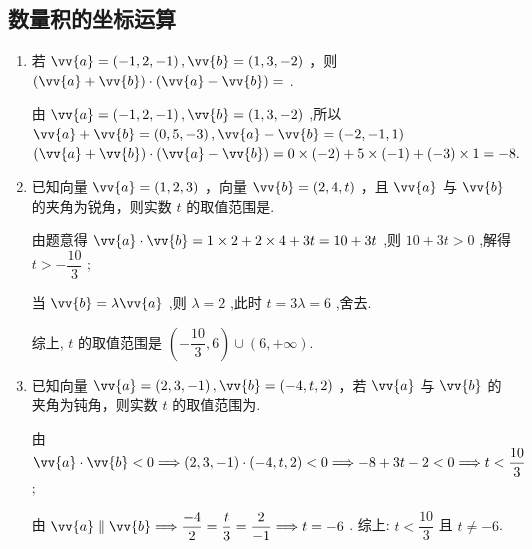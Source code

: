 \subsection*{数量积的坐标运算}
\begin{enumerate}
    \item 若 $\vv{a} = \left( {-1,2, - 1}\right) ,\vv{b} = \left( {1,3, - 2}\right)$ ，则 $\left( {\vv{a} + \vv{b}}\right)  \cdot  \left( {\vv{a} - \vv{b}}\right)  =$ .
    \begin{jieda}
        由 $\vv{a} = \left( {-1,2, - 1}\right) ,\vv{b} = \left( {1,3, - 2}\right)$ ,所以 $\vv{a} + \vv{b} = \left( {0,5, - 3}\right) ,\vv{a} - \vv{b} = \left( {-2, - 1,1}\right)$ 
        $\left( {\vv{a} + \vv{b}}\right)  \cdot  \left( {\vv{a} - \vv{b}}\right)  = 0 \times  \left( {-2}\right)  + 5 \times  \left( {-1}\right)  + \left( {-3}\right)  \times  1 =  - 8.$
    \end{jieda}
    
    \item 已知向量 $\vv{a} = \left( {1,2,3}\right)$ ，向量 $\vv{b} = \left( {2,4,t}\right)$ ，且 $\vv{a}$ 与 $\vv{b}$ 的夹角为锐角，则实数 $t$ 的取值范围是.
    \begin{jieda}
        由题意得 $\vv{a} \cdot  \vv{b} = 1 \times  2 + 2 \times  4 + {3t} = {10} + {3t}$ ,则 ${10} + {3t} > 0$ ,解得 $t >  - \dfrac{10}{3}$ ;

        当 $\vv{b} = \lambda \vv{a}$ ,则 $\lambda  = 2$ ,此时 $t = {3\lambda } = 6$ ,舍去.

        综上, $t$ 的取值范围是 $\left( {-\dfrac{10}{3},6}\right)  \cup  \left( {6, + \infty }\right)$.
    \end{jieda}
    
    \item 已知向量 $\vv{a} = \left( {2,3, - 1}\right) ,\vv{b} = \left( {-4,t,2}\right)$ ，若 $\vv{a}$ 与 $\vv{b}$ 的夹角为钝角，则实数 $t$ 的取值范围为.
    \begin{jieda}
        由 $\vv{a} \cdot  \vv{b} < 0 \Longrightarrow  \left( {2,3, - 1}\right) \cdot \left( {-4,t,2}\right)  < 0 \Longrightarrow   - 8 + {3t} - 2 < 0 \Longrightarrow  t < \dfrac{10}{3}$ ;

        由 $\vv{a}\parallel \vv{b} \Longrightarrow  \dfrac{-4}{2} = \dfrac{t}{3} = \dfrac{2}{-1} \Longrightarrow  t =  - 6$ . 综上: $t < \dfrac{10}{3}$ 且 $t \neq   - 6$.
    \end{jieda}


\end{enumerate}
